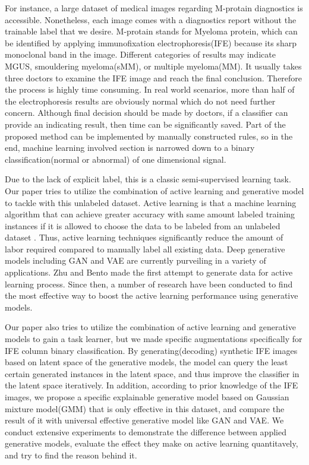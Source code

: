 \documentclass[letterpaper]{article}
\begin{document}
For instance, a large dataset of medical images regarding M-protain diagnostics is accessible. Nonetheless, each image comes with a diagnostics report without the trainable label that we desire. M-protain stands for Myeloma protein, which can be identified by applying immunofixation electrophoresis(IFE) because its sharp monoclonal band in the image. Different categories of results may indicate MGUS, smouldering myeloma(sMM), or multiple myeloma(MM). It usually takes three doctors to examine the IFE image and reach the final conclusion. Therefore the process is highly time consuming. In real world scenarios, more than half of the electrophoresis results are obviously normal which do not need further concern. Although final decision should be made by doctors, if a classifier can provide an indicating result, then time can be significantly saved. Part of the proposed method can be implemented by manually constructed rules, so in the end, machine learning involved section is narrowed down to a binary classification(normal or abnormal) of one dimensional signal.

Due to the lack of explicit label, this is a classic semi-supervised learning task. Our paper tries to utilize the combination of active learning and generative model to tackle with this unlabeled dataset. Active learning is that a machine learning algorithm that can achieve greater accuracy with same amount labeled training instances if it is allowed to choose the data to be labeled from an unlabeled dataset \cite{settles2009active}. Thus, active learning techniques significantly reduce the amount of labor required compared to manually label all existing data. Deep generative models including GAN and VAE are currently purveiling in a variety of applications. Zhu and Bento made the first attempt\cite{Zhu2017GenerativeAA} to generate data for active learning process. Since then, a number of research have been conducted to find the most effective way to boost the active learning performance using generative models.

Our paper also tries to utilize the combination of active learning and generative models to gain a task learner, but we made specific augmentations specifically for IFE column binary classification. By generating(decoding) synthetic IFE images based on latent space of the generative models, the model can query the least certain generated instances in the latent space, and thus improve the classifier in the latent space iteratively. In addition, according to prior knowledge of the IFE images, we propose a specific explainable generative model based on Gaussian mixture model(GMM) that is only effective in this dataset, and compare the result of it with universal effective generative model like GAN and VAE. We conduct extensive experiments to demonstrate the difference between applied generative models, evaluate the effect they make on active learning quantitavely, and try to find the reason behind it.
\end{document}
